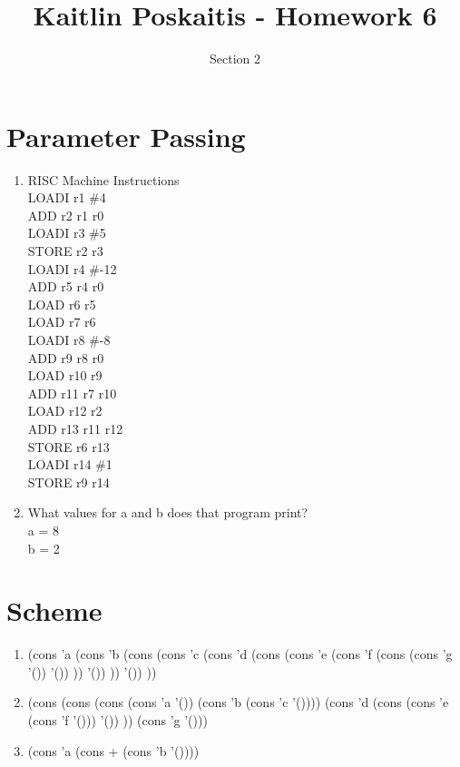 \documentclass[11pt]{article}
\title{\bf Kaitlin Poskaitis - Homework 6}
\author{Section 2}
\date{}
\begin{document}
\maketitle

\section{Parameter Passing}
\begin{enumerate}
	\item RISC Machine Instructions \\
	LOADI r1 \#4\\
	ADD r2 r1 r0\\
	LOADI r3 \#5\\
	STORE r2 r3\\

	LOADI r4 \#-12\\
	ADD r5 r4 r0\\
	LOAD r6 r5\\
	LOAD r7 r6\\
	
	LOADI r8 \#-8\\
	ADD r9 r8 r0\\
	LOAD r10 r9\\

	ADD r11 r7 r10\\
	LOAD r12 r2\\
	ADD r13 r11 r12\\
	STORE r6 r13\\

	LOADI r14 \#1\\
	STORE r9 r14

	\item What values for a and b does that program print?\\
	a = 8\\
	b = 2


\end{enumerate}

\section{Scheme}

\begin{enumerate}
	\item 
	(cons 'a (cons 'b 
		(cons (cons 'c (cons 'd 
			(cons (cons 'e (cons 'f 
				(cons (cons 'g '()) '())
			)) '())
		)) '()) 
	))
	\item
	(cons
		(cons 
			(cons 
				(cons 'a '())
			(cons 'b (cons 'c '())))
		(cons 'd 
			(cons (cons 'e (cons 'f '())) '())	
		))
	(cons 'g '()))
	\item
	(cons 'a (cons + (cons 'b '())))

\end{enumerate}
\end{document}
